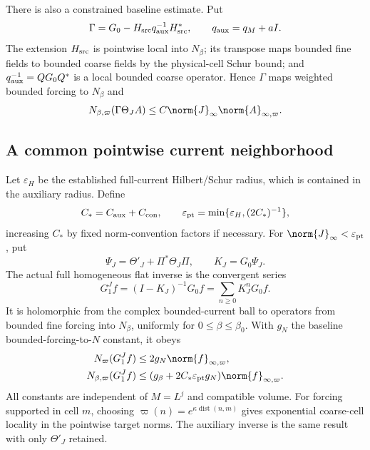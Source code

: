 There is also a constrained baseline estimate. Put
\begin{equation}\label{pc-constrained-baseline}
 \Gamma=G_0-H_{\rm src}q_{\rm aux}^{-1}H_{\rm src}^*,
 \qquad q_{\rm aux}=q_M+aI.
\end{equation}
The extension $H_{\rm src}$ is pointwise local into $N_\beta$;
its transpose maps bounded fine fields to bounded coarse fields
by the physical-cell Schur bound; and
$q_{\rm aux}^{-1}=QG_0Q^*$ is a local bounded coarse operator.
Hence $\Gamma$ maps weighted bounded forcing to $N_\beta$ and
\begin{equation}\label{pc-constrained-current}
 N_{\beta,\varpi}(\Gamma\Theta_JA)
      \le C\norm{J}_\infty\norm{A}_{\infty,\varpi}.
\end{equation}

\subsection{A common pointwise current neighborhood}

\begin{theorem}\label{pc-theorem}
Let $\varepsilon_H$ be the established full-current Hilbert/Schur
radius, which is contained in the auxiliary radius. Define
\begin{equation}\label{pc-radius}
 C_*=C_{\rm aux}+C_{\rm con},\qquad
 \varepsilon_{\rm pt}
       =\min\{\varepsilon_H,(2C_*)^{-1}\},
\end{equation}
increasing $C_*$ by fixed norm-convention factors if necessary.
For $\norm{J}_\infty<\varepsilon_{\rm pt}$, put
\begin{equation}\label{pc-full-perturbation}
 \Psi_J=\Theta'_J+\Pi^*\Theta_J\Pi,\qquad
 K_J=G_0\Psi_J.
\end{equation}
The actual full homogeneous flat inverse is the convergent series
\begin{equation}\label{pc-neumann-inverse}
 G_1^Jf=(I-K_J)^{-1}G_0f
                  =\sum_{n\ge0}K_J^nG_0f.
\end{equation}
It is holomorphic from the complex bounded-current ball to operators
from bounded fine forcing into $N_\beta$, uniformly for
$0\le\beta\le\beta_0$. With $g_N$ the baseline bounded-forcing-to-$N$
constant, it obeys
\begin{align}
 N_\varpi(G_1^Jf)
       &\le2g_N\norm{f}_{\infty,\varpi},
       \label{pc-inverse-N}\\
 N_{\beta,\varpi}(G_1^Jf)
       &\le(g_\beta+2C_*\varepsilon_{\rm pt}g_N)
                              \norm{f}_{\infty,\varpi}.
       \label{pc-inverse-Nbeta}
\end{align}
All constants are independent of $M=L^j$ and compatible volume.
For forcing supported in cell $m$, choosing
$\varpi(n)=e^{\kappa\operatorname{dist}(n,m)}$ gives exponential
coarse-cell locality in the pointwise target norms. The auxiliary
inverse is the same result with only $\Theta'_J$ retained.
\end{theorem}

